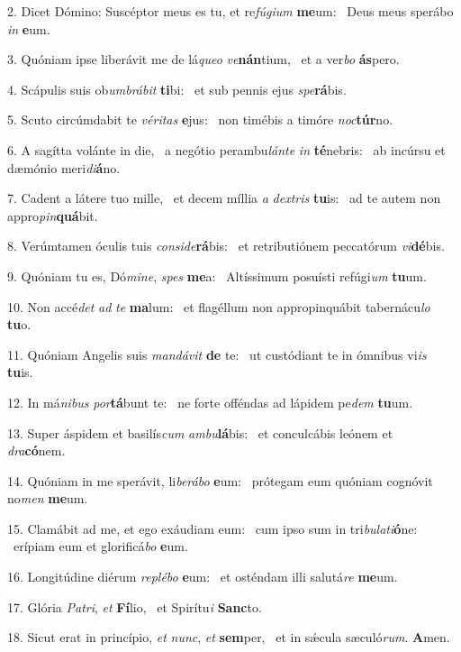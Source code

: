 2. Dicet Dómino: Suscéptor meus es tu, et re\textit{fú}\textit{gi}\textit{um} \textbf{me}um: \ast\  Deus meus sperábo \textit{in} \textbf{e}um.\

3. Quóniam ipse liberávit me de lá\textit{que}\textit{o} \textit{ve}\textbf{nán}tium, \ast\  et a ver\textit{bo} \textbf{ás}pero.\

4. Scápulis suis ob\textit{um}\textit{brá}\textit{bit} \textbf{ti}bi: \ast\  et sub pennis ejus \textit{spe}\textbf{rá}bis.\

5. Scuto circúmdabit te \textit{vé}\textit{ri}\textit{tas} \textbf{e}jus: \ast\  non timébis a timóre \textit{noc}\textbf{túr}no.\

6. A sagítta volánte in die, \dag\  a negótio perambu\textit{lán}\textit{te} \textit{in} \textbf{té}nebris: \ast\  ab incúrsu et dæmónio meri\textit{di}\textbf{á}no.\

7. Cadent a látere tuo mille, \dag\  et decem míllia \textit{a} \textit{dex}\textit{tris} \textbf{tu}is: \ast\  ad te autem non appro\textit{pin}\textbf{quá}bit.\

8. Verúmtamen óculis tuis \textit{con}\textit{si}\textit{de}\textbf{rá}bis: \ast\  et retributiónem peccatórum \textit{vi}\textbf{dé}bis.\

9. Quóniam tu es, Dó\textit{mi}\textit{ne}, \textit{spes} \textbf{me}a: \ast\  Altíssimum posuísti refúgi\textit{um} \textbf{tu}um.\

10. Non accé\textit{det} \textit{ad} \textit{te} \textbf{ma}lum: \ast\  et flagéllum non appropinquábit tabernácu\textit{lo} \textbf{tu}o.\

11. Quóniam Angelis suis \textit{man}\textit{dá}\textit{vit} \textbf{de} te: \ast\  ut custódiant te in ómnibus vi\textit{is} \textbf{tu}is.\

12. In má\textit{ni}\textit{bus} \textit{por}\textbf{tá}bunt te: \ast\  ne forte offéndas ad lápidem pe\textit{dem} \textbf{tu}um.\

13. Super áspidem et basilís\textit{cum} \textit{am}\textit{bu}\textbf{lá}bis: \ast\  et conculcábis leónem et \textit{dra}\textbf{có}nem.\

14. Quóniam in me sperávit, li\textit{be}\textit{rá}\textit{bo} \textbf{e}um: \ast\  prótegam eum quóniam cognóvit no\textit{men} \textbf{me}um.\

15. Clamábit ad me, et ego exáudiam eum: \dag\  cum ipso sum in tri\textit{bu}\textit{la}\textit{ti}\textbf{ó}ne: \ast\  erípiam eum et glorificá\textit{bo} \textbf{e}um.\

16. Longitúdine diérum \textit{re}\textit{plé}\textit{bo} \textbf{e}um: \ast\  et osténdam illi salutá\textit{re} \textbf{me}um.\

17. Glória \textit{Pa}\textit{tri}, \textit{et} \textbf{Fí}lio, \ast\  et Spirítu\textit{i} \textbf{Sanc}to.\

18. Sicut erat in princípio, \textit{et} \textit{nunc}, \textit{et} \textbf{sem}per, \ast\  et in sǽcula sæculó\textit{rum}. \textbf{A}men.\

